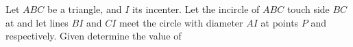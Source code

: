 Let $ ABC$ be a triangle, and $ I$ its incenter. Let the incircle of $ ABC$ touch side $ BC$ at  and let lines $ BI$ and $ CI$ meet the circle with diameter $ AI$ at points $ P$ and  respectively. Given  determine the value of 